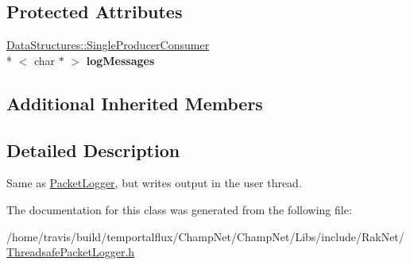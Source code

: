 \subsection*{Protected Attributes}
\begin{DoxyCompactItemize}
\item 
\hypertarget{class_rak_net_1_1_threadsafe_packet_logger_ac7b5b1358dd5ee916e0357d8eb5e63ea}{\hyperlink{class_data_structures_1_1_single_producer_consumer}{Data\-Structures\-::\-Single\-Producer\-Consumer}\\*
$<$ char $\ast$ $>$ {\bfseries log\-Messages}}\label{class_rak_net_1_1_threadsafe_packet_logger_ac7b5b1358dd5ee916e0357d8eb5e63ea}

\end{DoxyCompactItemize}
\subsection*{Additional Inherited Members}


\subsection{Detailed Description}
Same as \hyperlink{class_rak_net_1_1_packet_logger}{Packet\-Logger}, but writes output in the user thread. 

The documentation for this class was generated from the following file\-:\begin{DoxyCompactItemize}
\item 
/home/travis/build/temportalflux/\-Champ\-Net/\-Champ\-Net/\-Libs/include/\-Rak\-Net/\hyperlink{_threadsafe_packet_logger_8h}{Threadsafe\-Packet\-Logger.\-h}\end{DoxyCompactItemize}
